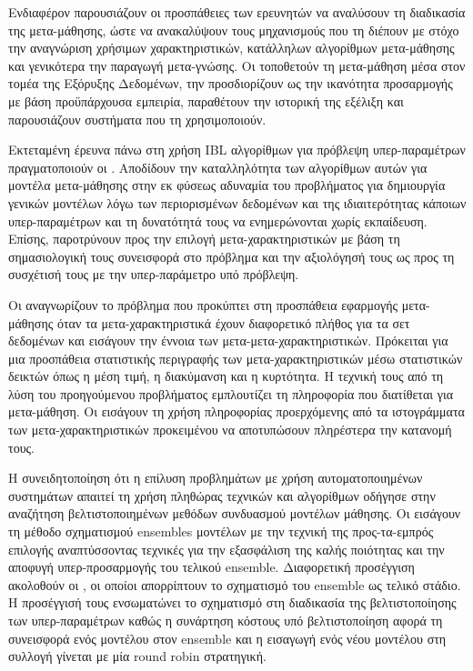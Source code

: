 Ενδιαφέρον παρουσιάζουν οι προσπάθειες των ερευνητών να αναλύσουν τη διαδικασία της μετα-μάθησης, ώστε να ανακαλύψουν τους μηχανισμούς που τη διέπουν με στόχο την αναγνώριση χρήσιμων χαρακτηριστικών, κατάλληλων αλγορίθμων μετα-μάθησης και γενικότερα την παραγωγή μετα-γνώσης. Οι \citet{Brazdil2009} τοποθετούν τη μετα-μάθηση μέσα στον τομέα της Εξόρυξης Δεδομένων, την προσδιορίζουν ως την ικανότητα προσαρμογής με βάση προϋπάρχουσα εμπειρία, παραθέτουν την ιστορική της εξέλιξη και παρουσιάζουν συστήματα που τη χρησιμοποιούν.

Εκτεταμένη έρευνα πάνω στη χρήση \gls{IBL} αλγορίθμων για πρόβλεψη υπερ-παραμέτρων πραγματοποιούν οι \citet{Abdulrahman:2014:MCA:3015544.3015557}. Αποδίδουν την καταλληλότητα των αλγορίθμων αυτών για μοντέλα μετα-μάθησης στην εκ φύσεως αδυναμία του προβλήματος για δημιουργία γενικών μοντέλων λόγω των περιορισμένων δεδομένων και της ιδιαιτερότητας κάποιων υπερ-παραμέτρων και τη δυνατότητά τους να ενημερώνονται χωρίς εκπαίδευση. Επίσης, παροτρύνουν προς την επιλογή μετα-χαρακτηριστικών με βάση τη σημασιολογική τους συνεισφορά στο πρόβλημα και την αξιολόγησή τους ως προς τη συσχέτισή τους με την υπερ-παράμετρο υπό πρόβλεψη. 

Οι \citet{Reif_meta2-features:} αναγνωρίζουν το πρόβλημα που προκύπτει στη προσπάθεια εφαρμογής μετα-μάθησης όταν τα μετα-χαρακτηριστικά έχουν διαφορετικό πλήθος για τα σετ δεδομένων και εισάγουν την έννοια των μετα-μετα-χαρακτηριστικών. Πρόκειται για μια προσπάθεια στατιστικής περιγραφής των μετα-χαρακτηριστικών μέσω στατιστικών δεικτών όπως η μέση τιμή, η διακύμανση και η κυρτότητα. Η τεχνική τους από τη λύση του προηγούμενου προβλήματος εμπλουτίζει τη πληροφορία που διατίθεται για μετα-μάθηση. Οι \citet{Bensusan:2001:EPA:645328.650030} εισάγουν τη χρήση πληροφορίας προερχόμενης από τα ιστογράμματα των μετα-χαρακτηριστικών προκειμένου να αποτυπώσουν πληρέστερα την κατανομή τους.

Η συνειδητοποίηση ότι η επίλυση προβλημάτων με χρήση αυτοματοποιημένων συστημάτων απαιτεί τη χρήση πληθώρας τεχνικών και αλγορίθμων οδήγησε στην αναζήτηση βελτιστοποιημένων μεθόδων συνδυασμού μοντέλων μάθησης. Οι \citet{Caruana:2004:ESL:1015330.1015432} εισάγουν τη μέθοδο σχηματισμού ensembles μοντέλων με την τεχνική της προς-τα-εμπρός επιλογής αναπτύσσοντας τεχνικές για την εξασφάλιση της καλής ποιότητας και την αποφυγή υπερ-προσαρμογής του τελικού ensemble. Διαφορετική προσέγγιση ακολοθούν οι \citet{ensemble}, οι οποίοι απορρίπτουν το σχηματισμό του ensemble ως τελικό στάδιο. Η προσέγγισή τους ενσωματώνει το σχηματισμό στη διαδικασία της βελτιστοποίησης των υπερ-παραμέτρων καθώς η συνάρτηση κόστους υπό βελτιστοποίηση αφορά τη συνεισφορά ενός μοντέλου στον ensemble και η εισαγωγή ενός νέου μοντέλου στη συλλογή γίνεται με μία round robin στρατηγική. 
